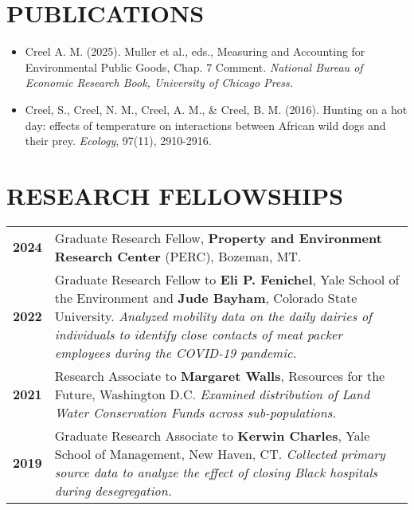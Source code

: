 \documentclass[11pt]{article}
\begin{document}
\section*{PUBLICATIONS}

\begin{itemize}[left=0pt, label={}, align=left, itemsep=0pt, parsep=0pt]
    \setlength{\itemindent}{-1em}
    \setlength{\leftskip}{1em}
    \setlength{\parindent}{-1em}
    \item Creel A. M. (2025). Muller et al., eds., Measuring and Accounting for Environmental Public Goods, Chap. 7 Comment. \textit{National Bureau of Economic Research Book, University of Chicago Press.}
    \item Creel, S., Creel, N. M., Creel, A. M., \& Creel, B. M. (2016). Hunting on a hot day: effects of temperature on interactions between African wild dogs and their prey. \textit{Ecology}, 97(11), 2910-2916.
\end{itemize}


\section*{RESEARCH FELLOWSHIPS}
\begin{longtable}{>{\bfseries}r p{5.5in}} %
2024 & Graduate Research Fellow, \textbf{Property and Environment Research Center} (PERC), Bozeman, MT. \\
2022 & Graduate Research Fellow to \textbf{Eli P. Fenichel}, Yale School of the Environment and \textbf{Jude Bayham}, Colorado State University. \textit{Analyzed mobility data on the daily dairies of individuals to identify close contacts of meat packer employees during the COVID-19 pandemic.} \\
2021 & Research Associate to \textbf{Margaret Walls}, Resources for the Future, Washington D.C. \textit{Examined distribution of Land Water Conservation Funds across sub-populations.}\\
2019 & Graduate Research Associate to \textbf{Kerwin Charles}, Yale School of Management, New Haven, CT. \textit{Collected primary source data to analyze the effect of closing Black hospitals during desegregation.} \\
\end{longtable}
\end{document}
